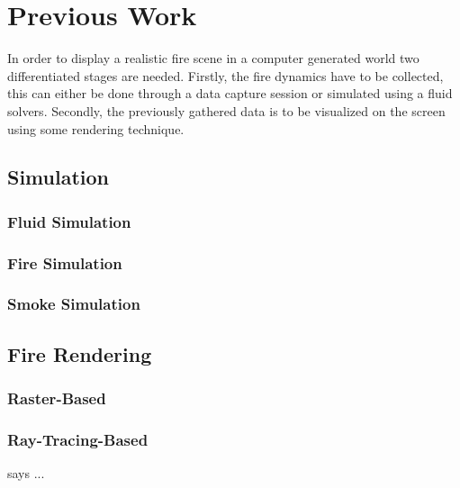 \chapter{Previous Work}
\label{ch:previous_work}

In order to display a realistic fire scene in a computer generated world two differentiated stages are needed.
Firstly, the fire dynamics have to be collected, this can either be done through a data capture session or simulated using a fluid solvers.
Secondly, the previously gathered data is to be visualized on the screen using some rendering technique.

\section{Simulation}
\label{sec:simulation}


\subsection{Fluid Simulation}
\label{sec:fluid_simulation}


\subsection{Fire Simulation}
\label{sec:fire_simulation}


\subsection{Smoke Simulation}
\label{sec:smoke_simulation}


\section{Fire Rendering}
\label{sec:fire_rendering}


\subsection{Raster-Based}
\label{sec:raster_based}


\subsection{Ray-Tracing-Based}
\label{sec:ray_tracing_based}


\cite{Pegoraro:2006} says ...